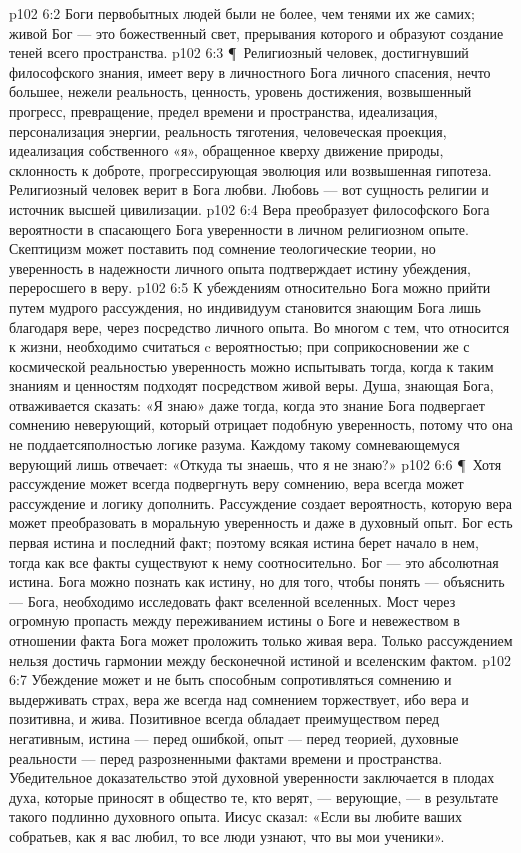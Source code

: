 \vs p102 6:2 Боги первобытных людей были не более, чем тенями их же самих; живой Бог --- это божественный свет, прерывания которого и образуют создание теней всего пространства.
\vs p102 6:3 \P\ Религиозный человек, достигнувший философского знания, имеет веру в личностного Бога личного спасения, нечто большее, нежели реальность, ценность, уровень достижения, возвышенный прогресс, превращение, предел времени и пространства, идеализация, персонализация энергии, реальность тяготения, человеческая проекция, идеализация собственного «я», обращенное кверху движение природы, склонность к доброте, прогрессирующая эволюция или возвышенная гипотеза. Религиозный человек верит в Бога любви. Любовь --- вот сущность религии и источник высшей цивилизации.
\vs p102 6:4 Вера преобразует философского Бога вероятности в спасающего Бога уверенности в личном религиозном опыте. Скептицизм может поставить под сомнение теологические теории, но уверенность в надежности личного опыта подтверждает истину убеждения, переросшего в веру.
\vs p102 6:5 К убеждениям относительно Бога можно прийти путем мудрого рассуждения, но индивидуум становится знающим Бога лишь благодаря вере, через посредство личного опыта. Во многом с тем, что относится к жизни, необходимо считаться c вероятностью; при соприкосновении же с космической реальностью уверенность можно испытывать тогда, когда к таким знаниям и ценностям подходят посредством живой веры. Душа, знающая Бога, отваживается сказать: «Я знаю» даже тогда, когда это знание Бога подвергает сомнению неверующий, который отрицает подобную уверенность, потому что она не поддаетсяполностью логике разума. Каждому такому сомневающемуся верующий лишь отвечает: «Откуда ты знаешь, что я не знаю?»
\vs p102 6:6 \P\ Хотя рассуждение может всегда подвергнуть веру сомнению, вера всегда может рассуждение и логику дополнить. Рассуждение создает вероятность, которую вера может преобразовать в моральную уверенность и даже в духовный опыт. Бог есть первая истина и последний факт; поэтому всякая истина берет начало в нем, тогда как все факты существуют к нему соотносительно. Бог --- это абсолютная истина. Бога можно познать как истину, но для того, чтобы понять --- объяснить --- Бога, необходимо исследовать факт вселенной вселенных. Мост через огромную пропасть между переживанием истины о Боге и невежеством в отношении факта Бога может проложить только живая вера. Только рассуждением нельзя достичь гармонии между бесконечной истиной и вселенским фактом.
\vs p102 6:7 Убеждение может и не быть способным сопротивляться сомнению и выдерживать страх, вера же всегда над сомнением торжествует, ибо вера и позитивна, и жива. Позитивное всегда обладает преимуществом перед негативным, истина --- перед ошибкой, опыт --- перед теорией, духовные реальности --- перед разрозненными фактами времени и пространства. Убедительное доказательство этой духовной уверенности заключается в плодах духа, которые приносят в общество те, кто верят, --- верующие, --- в результате такого подлинно духовного опыта. Иисус сказал: «Если вы любите ваших собратьев, как я вас любил, то все люди узнают, что вы мои ученики».
